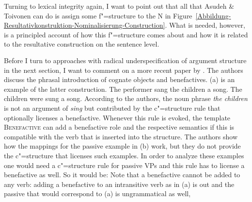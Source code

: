 Turning to lexical integrity again, I want to point out that all that Asudeh \& Toivonen can do is
assign some f"=structure to the N in
Figure~\ref{Abbildung-Resultativkonstruktion-Nominalisierung-Construction}. What is needed, however,
is a principled account of how this f"=structure comes about and how it is related to the
resultative construction on the sentence level.

Before I turn to approaches with radical underspecification of argument structure in the next
section, I want to comment on a more recent paper by \citet*{AGT2014a}. The authors discuss the
phrasal introduction of cognate objects and benefactives. (a) is an example of the latter construction. 
\eal
\ex The performer sang the children a song.
\ex The children were sung a song. 
\zl
According to the authors, the noun phrase \emph{the children} is not an argument of \emph{sing} but
contributed by the c"=structure rule that optionally licenses a benefactive.
\ea\label{c-struc-vp-benefactive}
\z
Whenever this rule is evoked, the template \textsc{Benefactive} can add a benefactive role and the
respective semantics if this is compatible with the verb that is inserted into the structure. The
authors show how the mappings for the passive example in (b) work, but they do not provide
the c"=structure that licenses such examples. In order to analyze these examples one would need a
c"=structure rule for passive VPs and this rule has to license a benefactive as well. So it would
be:
\ea\label{c-struc-vp-benefactive-passive}
\z
Note that a benefactive cannot be added to any verb: adding a benefactive to an intransitive verb as
in (a) is out and the passive that would correspond to (a) is ungrammatical as well,
